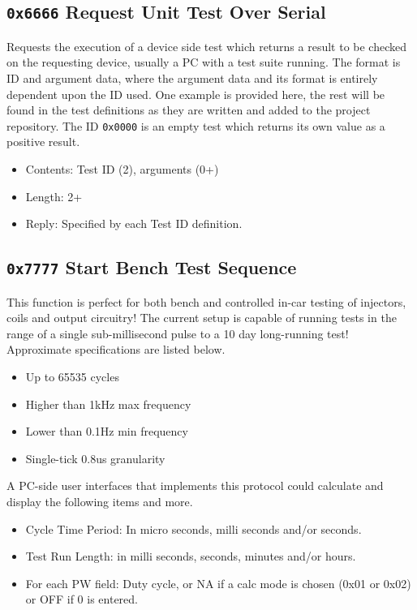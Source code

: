 \documentclass[12pt,a4paper,titlepage]{article}
\begin{document}
\subsection{\texttt{0x6666} Request Unit Test Over Serial}

Requests the execution of a device side test which returns a result to be checked on the requesting device, usually a PC with a test suite running. The format is ID and argument data, where the argument data and its format is entirely dependent upon the ID used. One example is provided here, the rest will be found in the test definitions as they are written and added to the project repository. The ID \texttt{0x0000} is an empty test which returns its own value as a positive result.

\begin{itemize}
\item Contents: Test ID (2), arguments (0+)
\item Length: 2+
\item Reply: Specified by each Test ID definition.
\end{itemize}


\subsection{\texttt{0x7777} Start Bench Test Sequence}

This function is perfect for both bench and controlled in-car testing of injectors, coils and output circuitry! The current setup is capable of running tests in the range of a single sub-millisecond pulse to a 10 day long-running test! Approximate specifications are listed below.

\begin{itemize}
\item Up to 65535 cycles
\item Higher than 1kHz max frequency
\item Lower than 0.1Hz min frequency
\item Single-tick 0.8us granularity
\end{itemize}

A PC-side user interfaces that implements this protocol could calculate and display the following items and more.

\begin{itemize}
\item Cycle Time Period: In micro seconds, milli seconds and/or seconds.
\item Test Run Length: in milli seconds, seconds, minutes and/or hours.
\item For each PW field: Duty cycle, or NA if a calc mode is chosen (0x01 or 0x02) or OFF if 0 is entered.
\end{itemize}
\end{document}
